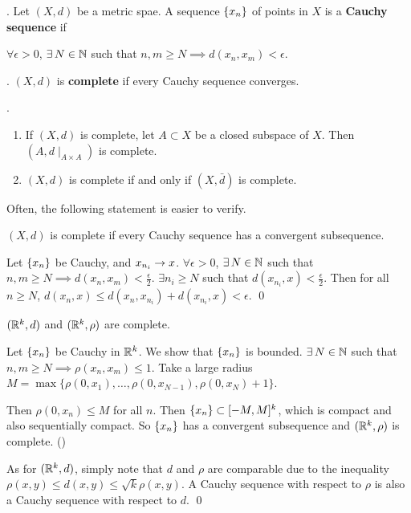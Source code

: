 \setcounter{topic}{42}


.  Let \((X, d)\) be a metric spae. A sequence \(\left\{ x_n \right\}\) of points in \(X\) is a \textbf{Cauchy sequence} if
\begin{center}
    \(\forall \epsilon > 0\), \(\exists N \in \N\) such that \(n, m \geq N \implies d(x_n, x_m) < \epsilon\).
\end{center}

.  \((X, d)\) is \textbf{complete} if every Cauchy sequence converges.

\ex.
\begin{enumerate}
    \item If \((X, d)\) is complete, let \(A \subset X\) be a closed subspace of \(X\). Then \((A, d\mid_{A \times A})\) is complete.
    \item \((X, d)\) is complete if and only if \((X, \bar{d})\) is complete.
\end{enumerate}
Often, the following statement is easier to verify.

 \((X, d)\) is complete if every Cauchy sequence has a convergent subsequence.

\pf Let \(\left\{ x_n \right\}\) be Cauchy, and \(x_{n_i} \rightarrow x\). \(\forall \epsilon > 0\), \(\exists N \in \N\) such that \(n, m \geq N \implies d(x_n, x_m) < \frac{\epsilon}{2}\). \(\exists n_i \geq N\) such that \(d(x_{n_i}, x) < \frac{\epsilon}{2}\). Then for all \(n \geq N\), \(d(x_n, x) \leq d(x_n, x_{n_i}) + d(x_{n_i}, x) < \epsilon\). \qed

 \((\mathbb{R}^k, d)\) and \((\mathbb{R}^k, \rho)\) are complete.

\pf Let \(\left\{ x_n \right\}\) be Cauchy in \(\mathbb{R}^k\). We show that \(\left\{ x_n \right\}\) is bounded. \(\exists N \in \N\) such that \(n, m \geq N \implies \rho(x_n, x_m) \leq 1\). Take a large radius \(M = \max\{\rho(0, x_1), \dots, \rho(0, x_{N-1}), \rho(0, x_N) + 1\}\).

Then \(\rho(0, x_n) \leq M\) for all \(n\). Then \(\left\{ x_n \right\} \subset [-M, M]^k\), which is compact and also sequentially compact. So \(\left\{ x_n \right\}\) has a convergent subsequence and \((\mathbb{R}^k, \rho)\) is complete. ()

As for \((\mathbb{R}^k, d)\), simply note that \(d\) and \(\rho\) are comparable due to the inequality \(\rho(x, y) \leq d(x, y) \leq \sqrt{k} \rho(x, y)\). A Cauchy sequence with respect to \(\rho\) is also a Cauchy sequence with respect to \(d\). \qed


